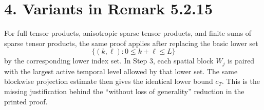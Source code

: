 \documentclass[11pt]{article}
\theoremstyle{definition}
\begin{document}
\section*{4. Variants in Remark 5.2.15}
For full tensor products, anisotropic sparse tensor products, and finite sums of sparse tensor products, the same proof applies after replacing the basic lower set
\[
  \{(k,\ell):0\le k+\ell\le L\}
\]
by the corresponding lower index set.  In Step 3, each spatial block \(W_j\) is paired with the largest active temporal level allowed by that lower set.  The same blockwise projection estimate then gives the identical lower bound \(c_T\).  This is the missing justification behind the ``without loss of generality'' reduction in the printed proof.
\end{document}
